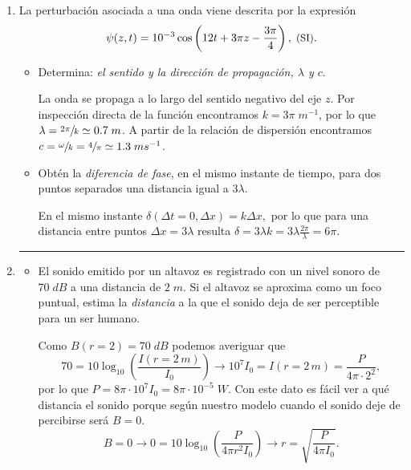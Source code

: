 \documentclass[a4paper,14pt]{exam}
\newcommand{\halmos}{\vspace*{-7mm}
	
					\begin{flushright}
						\rule{1mm}{2.5mm} 
					\end{flushright}\vspace*{-6mm}
						
					  }
\renewcommand{\qed}{\halmos}
\begin{document}
	

\begin{enumerate}
	
		\item La perturbación asociada a una onda viene descrita por la expresión
$$\psi(z,t)= 10^{-3}\cos\left(12t +3\pi z-\frac{3\pi}{4}\right),\; \text{\small (SI)}.$$
	\begin{itemize}
		\item[a)] Determina: \textit{el sentido y la dirección de propagación, $\lambda$ y $c$}.
		\begin{mdframed}[backgroundcolor=yellow!20]  
		La onda se propaga a lo largo del sentido negativo del eje $z$. Por inspección directa de la función encontramos $k=3\pi\;m^{-1}$, por lo que $\lambda=\sfrac{2\pi}{k}\simeq 0.7\;m$. A partir de la relación de dispersión encontramos $c=\sfrac{\omega}{k}=\sfrac{4}{\pi}\simeq 1.3\;ms^{-1}$.
		\end{mdframed}
		\item[b)] Obtén la \textit{diferencia de fase}, en el mismo instante de tiempo, para dos puntos separados una distancia igual a $3\lambda$.
		\begin{mdframed}[backgroundcolor=yellow!20]  
		En el mismo instante $\delta(\Delta t=0,\Delta x)=k\Delta x,$ por lo que para una distancia entre puntos $\Delta x=3\lambda$ resulta $\delta=3\lambda k=3\lambda\frac{2\pi}{\lambda}=6\pi.$
		\end{mdframed}
	\end{itemize}
	\qed
		
		\newpage
		\item 
			\begin{itemize}
				\item[a)] El sonido emitido por un altavoz es registrado con un nivel sonoro de $70\;dB$ a una 
distancia de $2\;m$. Si el altavoz se aproxima como un foco puntual, estima la \textit{distancia} a la que el sonido deja de ser perceptible para un ser humano.
\begin{mdframed}[backgroundcolor=yellow!20]  
 Como $B(r=2)=70\;dB$ podemos averiguar que
\[70=10\log_{10}\left(\frac{I(r=2\,m)}{I_0}\right)\longrightarrow 10^7I_0=I(r=2\,m)=\frac{P}{4\pi\cdot 2^2},\]
por lo que $P=8\pi\cdot 10^7I_0=8\pi\cdot 10^{-5}\;W.$ Con este dato es fácil ver a qué distancia el sonido porque según nuestro modelo cuando el sonido deje de percibirse será $B=0$.
\[B=0\longrightarrow 0=10\log_{10}\left(\frac{P}{4\pi r^2I_0}\right)\longrightarrow r=\sqrt{\frac{P}{4\pi I_0}}.\]


\end{mdframed}
\end{itemize}
\end{enumerate}
\end{document}
